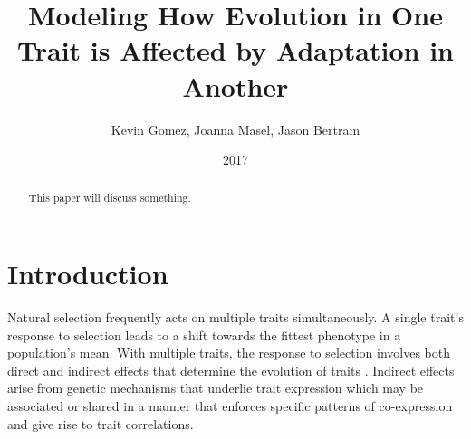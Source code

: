 \documentclass{article}
\begin{document}
\title{Modeling How Evolution in One Trait is Affected by Adaptation in Another}
\author{Kevin Gomez, Joanna Masel, Jason Bertram}
\date{2017}

\maketitle
\newpage

\begin{abstract}
This paper will discuss something.
\end{abstract}

\section*{Introduction}
Natural selection frequently acts on multiple traits simultaneously. A single trait’s response to selection leads to a shift towards the fittest phenotype in a population’s mean.  With multiple traits, the response to selection involves both direct and indirect effects that determine the evolution of traits \cite{Scarcelli23102007,Lovell2013,Wagner2011}.  Indirect effects arise from genetic mechanisms that underlie trait expression which may be associated or shared in a manner that enforces specific patterns of co-expression and give rise to trait correlations.
\end{document}
